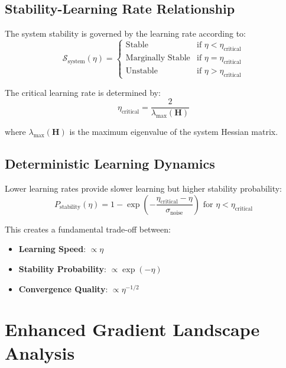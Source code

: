 \subsection{Stability-Learning Rate Relationship}

The system stability is governed by the learning rate according to:
\begin{equation}
\mathcal{S}_{\text{system}}(\eta) = \begin{cases}
\text{Stable} & \text{if } \eta < \eta_{\text{critical}} \\
\text{Marginally Stable} & \text{if } \eta = \eta_{\text{critical}} \\
\text{Unstable} & \text{if } \eta > \eta_{\text{critical}}
\end{cases}
\end{equation}

The critical learning rate is determined by:
\begin{equation}
\eta_{\text{critical}} = \frac{2}{\lambda_{\text{max}}(\mathbf{H})}
\end{equation}

where $\lambda_{\text{max}}(\mathbf{H})$ is the maximum eigenvalue of the system Hessian matrix.

\subsection{Deterministic Learning Dynamics}

Lower learning rates provide slower learning but higher stability probability:
\begin{equation}
P_{\text{stability}}(\eta) = 1 - \exp\left(-\frac{\eta_{\text{critical}} - \eta}{\sigma_{\text{noise}}}\right) \text{ for } \eta < \eta_{\text{critical}}
\end{equation}

This creates a fundamental trade-off between:
\begin{itemize}
    \item \textbf{Learning Speed}: $\propto \eta$
    \item \textbf{Stability Probability}: $\propto \exp(-\eta)$
    \item \textbf{Convergence Quality}: $\propto \eta^{-1/2}$
\end{itemize}

\section{Enhanced Gradient Landscape Analysis}

